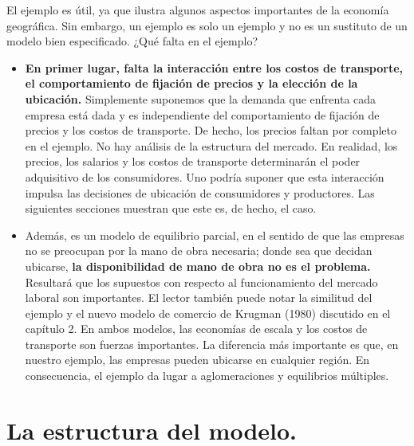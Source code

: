 El ejemplo es útil, ya que ilustra algunos aspectos importantes de la economía geográfica. Sin embargo, un ejemplo es solo un ejemplo y no es un sustituto de un modelo bien especificado. ¿Qué falta en el ejemplo?\\
\begin{itemize}
    \item \textbf{En primer lugar, falta la interacción entre los costos de transporte, el comportamiento de fijación de precios y la elección de la ubicación.} Simplemente suponemos que la demanda que enfrenta cada empresa está dada y es independiente del comportamiento de fijación de precios y los costos de transporte. De hecho, los precios faltan por completo en el ejemplo. No hay análisis de la estructura del mercado. En realidad, los precios, los salarios y los costos de transporte determinarán el poder adquisitivo de los consumidores. Uno podría suponer que esta interacción impulsa las decisiones de ubicación de consumidores y productores. Las siguientes secciones muestran que este es, de hecho, el caso.
    \item Además, es un modelo de equilibrio parcial, en el sentido de que las empresas no se preocupan por la mano de obra necesaria; donde sea que decidan ubicarse, \textbf{la disponibilidad de mano de obra no es el problema.} Resultará que los supuestos con respecto al funcionamiento del mercado laboral son importantes. El lector también puede notar la similitud del ejemplo y el nuevo modelo de comercio de Krugman (1980) discutido en el capítulo 2. En ambos modelos, las economías de escala y los costos de transporte son fuerzas importantes. La diferencia más importante es que, en nuestro ejemplo, las empresas pueden ubicarse en cualquier región. En consecuencia, el ejemplo da lugar a aglomeraciones y equilibrios múltiples.
\end{itemize}

\section{La estructura del modelo.}


